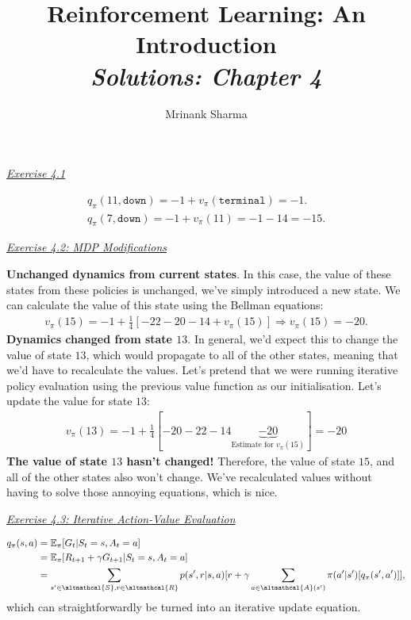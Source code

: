 \documentclass{article}
\title{\textbf{Reinforcement Learning: An Introduction}\\
\textit{Solutions: Chapter 4}
}
\author{Mrinank Sharma}
\newcommand{\myq}[1]{%
	\vspace{1em}
	\noindent\underline{\emph{Exercise #1}}\vspace{0.25em}\linebreak
}
\begin{document}
\maketitle

\myq{4.1}
\begin{align}
q_\pi(11, \texttt{down}) = -1 + v_\pi(\texttt{terminal}) = -1. \\
q_\pi(7, \texttt{down}) = -1 + v_\pi(11) = -1 -14 = -15 .
\end{align}  

\myq{4.2: MDP Modifications}
\textbf{Unchanged dynamics from current states}. In this case, the value of these states from these policies is unchanged, we've simply introduced a new state. We can calculate the value of this state using the Bellman equations:
\begin{align}
v_\pi(15) = -1 + \frac{1}{4}[-22 -20 -14 +v_\pi(15)] \Rightarrow v_\pi(15) = -20.
\end{align}
\textbf{Dynamics changed from state $13$}. In general, we'd expect this to change the value of state $13$, which would propagate to all of the other states, meaning that we'd have to recalculate the values. Let's pretend that we were running iterative policy evaluation using the previous value function as our initialisation. Let's update the value for state $13$:
\begin{align}
v_\pi(13) = -1 + \frac{1}{4}[-20 -22 -14 \underbrace{-20}_{\text{Estimate for } v_\pi(15)}] = -20
\end{align}
\textbf{The value of state $13$ hasn't changed!} Therefore, the value of state $15$, and all of the other states also won't change. We've recalculated values without having to solve those annoying equations, which is nice. 

\myq{4.3: Iterative Action-Value Evaluation}
\begin{align}
q_\pi(s, a) &=\mathbb{E}_\pi[G_t | S_t = s, A_t = a] \nonumber \\
&= \mathbb{E}_\pi[R_{t+1} + \gamma G_{t+1} | S_t = s, A_t = a] \nonumber \\
&= \sum_{s' \in \altmathcal{S}, r \in \altmathcal{R}} p(s', r | s, a) [r + \gamma \sum_{a \in \altmathcal{A}(s')} \pi(a' | s')[q_\pi(s', a')]],
\end{align}
which can straightforwardly be turned into an iterative update equation. 
\end{document}
